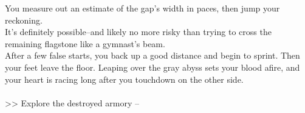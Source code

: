You measure out an estimate of the gap's width in paces, then jump your reckoning.\\

It's definitely possible--and likely no more risky than trying to cross the remaining flagstone like a gymnast's beam.\\

After a few false starts, you back up a good distance and begin to sprint. Then your feet leave the floor. Leaping over the gray abyss sets your blood afire, and your heart is racing long after you touchdown on the other side.\\
\\

>> Explore the destroyed armory -- 